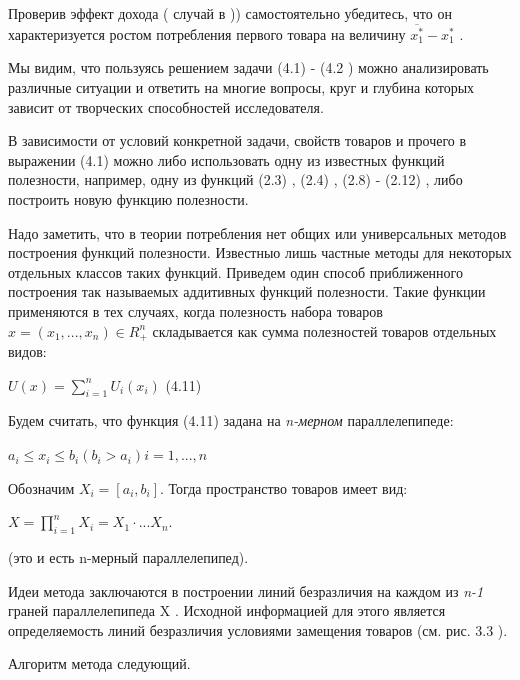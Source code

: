 \documentclass[12pt, 4paper]{book}
\begin{document}
{Проверив эффект дохода ( случай в )) самостоятельно убедитесь, что он характеризуется ростом потребления первого товара на величину $\overline{x_{1}^{*}} - x_{1}^{*}$ .
\par

Мы видим, что пользуясь решением задачи (4.1) - (4.2 ) можно анализировать различные ситуации и ответить на многие вопросы, круг и глубина которых зависит от творческих способностей исследователя.
\par

В зависимости от условий конкретной задачи, свойств товаров и прочего в выражении (4.1) можно либо использовать одну из известных функций полезности, например, одну из функций (2.3) , (2.4) , (2.8) - (2.12) , либо построить новую функцию полезности.
\par

Надо заметить, что в теории потребления нет общих или универсальных методов построения функций полезности. Известныо лишь частные методы для некоторых отдельных классов таких функций. Приведем один способ приближенного построения так называемых аддитивных функций полезности. Такие функции применяются в тех случаях, когда полезность набора товаров $x = (x_1,...,x_n) \in R_{+}^{n}$ складывается как сумма полезностей товаров отдельных видов: 
\begin{center}
$U(x)=\sum\limits_{i=1}^{n} U_{i}(x_{i})$ (4.11)
\end{center}
\par

Будем считать, что функция (4.11) задана на \textit{n-мерном} параллелепипеде: 
\begin{center}
$a_i \leq x_i \leq b_i (b_i > a_i) i=1,...,n$
\end{center}
\par

Обозначим $X_i=[a_i,b_i]$. Тогда пространство товаров имеет вид: 
\begin{center}
$X = \prod \limits_{i=1}^{n}X_i = X_1 \cdot ... X_n.$ 
\end{center}
(это и есть n-мерный параллелепипед). 
\par

Идеи метода заключаются в построении линий безразличия на каждом из \textit{n-1} граней параллелепипеда X . Исходной информацией для этого является определяемость линий безразличия условиями замещения товаров (см. рис. 3.3 ).
\par

Алгоритм метода следующий. 
\par

}
\end{document}

